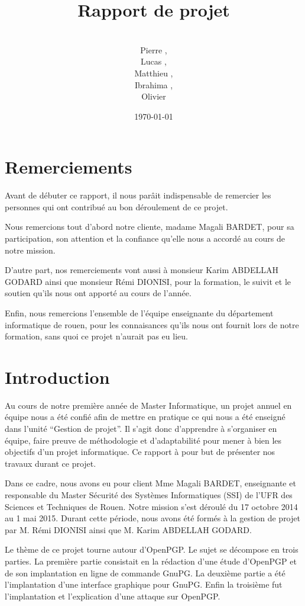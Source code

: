 \documentclass{../res/univ-projet}
\title{Rapport de projet}
\author{\\ Pierre \bsc{Balmelle},\\ Lucas \bsc{Barbay}, \\ Matthieu \bsc{Fin},
\\ Ibrahima \bsc{Sorry Barry},\\ Olivier \bsc{Thibault}}
\date{\today}
\begin{document}
\maketitle
\newpage
\section{Remerciements}
Avant de débuter ce rapport, il nous parâit indispensable de remercier les 
personnes qui ont contribué au bon déroulement de ce projet.

Nous remercions tout d'abord notre cliente, madame Magali BARDET, pour sa 
participation, son attention et la confiance qu'elle nous a accordé au 
cours de notre mission.

D'autre part, nos remerciements vont aussi à monsieur Karim ABDELLAH 
GODARD ainsi que monsieur Rémi DIONISI, pour la formation, le suivit 
et le soutien qu'ils nous ont apporté au cours de l'année.

Enfin, nous remercions l'ensemble de l'équipe enseignante du département 
informatique de rouen, pour les connaisances qu'ils nous ont fournit lors 
de notre formation, sans quoi ce projet n'aurait pas eu lieu.
\newpage
\tableofcontents

\newpage

\section{Introduction}

Au cours de notre première année de Master Informatique, un projet annuel 
en équipe nous a été confié afin de mettre en pratique ce qui nous a 
été enseigné dans l'unité ``Gestion de projet''. Il s'agit donc d'apprendre 
à s'organiser en équipe, faire preuve de méthodologie et d'adaptabilité 
pour mener à bien les objectifs d'un projet informatique. Ce rapport à pour 
but de présenter nos travaux durant ce projet.

Dans ce cadre, nous avons eu pour client Mme Magali BARDET, enseignante et 
responsable du Master Sécurité des Systèmes Informatiques (SSI) de l'UFR des 
Sciences et Techniques de Rouen. Notre mission s'est déroulé du 17 octobre 
2014 au 1 mai 2015. Durant cette période, nous avons été formés à la 
gestion de projet par M. Rémi DIONISI ainsi que M. Karim ABDELLAH GODARD.

Le thème de ce projet tourne autour d'OpenPGP. Le sujet se décompose en trois 
parties. La première partie consistait en la rédaction d'une étude d'OpenPGP 
et de son implantation en ligne de commande GnuPG. La deuxième partie a été 
l'implantation d'une interface graphique pour GnuPG. Enfin la troisième fut 
l'implantation et l'explication d'une attaque sur OpenPGP.
\end{document}
